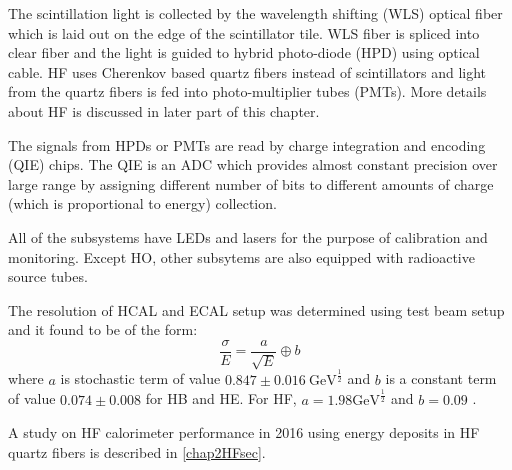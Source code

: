 The scintillation light is collected by the wavelength shifting (WLS) optical fiber which is laid out on the edge of the scintillator 
tile. WLS fiber is spliced into clear fiber and the light is guided to hybrid photo-diode (HPD) using optical cable. HF uses Cherenkov 
based quartz fibers instead of scintillators and light from the quartz fibers is fed into photo-multiplier tubes (PMTs). More details 
about HF is discussed in later part of this chapter.

The signals from HPDs or PMTs are read by charge integration and encoding (QIE) chips. The QIE is an ADC which provides almost constant 
precision over large range by assigning different number of bits to different amounts of charge (which is proportional to energy) 
collection.

All of the subsystems have LEDs and lasers for the purpose of calibration and monitoring. Except HO, other subsytems are also equipped 
with radioactive source tubes.

The resolution of HCAL and ECAL setup was determined using test beam setup and it found to be of the form:
\begin{equation}
\frac{\sigma}{E} = \frac{a}{\sqrt{E}} \oplus b
\end{equation}
where $a$ is stochastic term of value $0.847\pm 0.016\ {\mathrm{GeV}}^{\frac{1}{2}}$ and $b$ is a constant term of value $0.074\pm0.008$ 
for HB and HE. For HF, $a = 1.98 {\mathrm{GeV}}^{\frac{1}{2}}$ and $b = 0.09$ \cite{Chatrchyan:2009ag}.

A study on HF calorimeter performance in 2016 using energy deposits in HF quartz fibers is described in \ref{chap2HFsec}.

